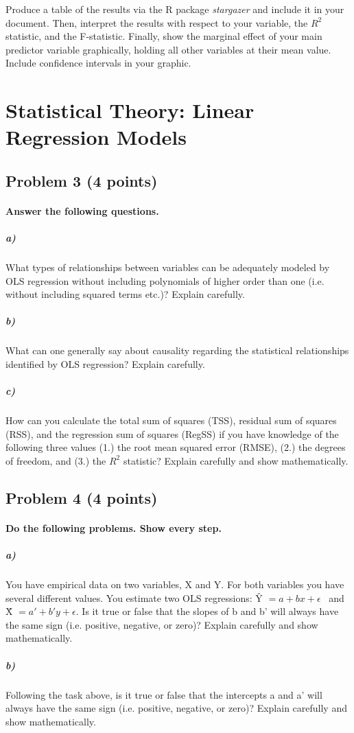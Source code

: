 \documentclass[12pt]{article}
\begin{document}
Produce a table of the results via the R package \textit{stargazer} and include it in your document. Then, interpret the results with respect to your variable, the $R^2$ statistic, and the F-statistic. Finally, show the marginal effect of your main predictor variable graphically, holding all other variables at their mean value. Include confidence intervals in your graphic.



\pagebreak

\section*{Statistical Theory: Linear Regression Models}

\subsection*{Problem 3 (4 points)}

\paragraph{Answer the following questions.}

\subparagraph{a)} What types of relationships between variables can be adequately modeled by OLS regression without including polynomials of higher order than one (i.e. without including squared terms etc.)? Explain carefully.

\subparagraph{b)} What can one generally say about causality regarding the statistical relationships identified by OLS regression? Explain carefully.

\subparagraph{c)} How can you calculate the total sum of squares (TSS), residual sum of squares (RSS), and the regression sum of squares (RegSS) if you have knowledge of the following three values (1.) the root mean squared error (RMSE), (2.) the degrees of freedom, and (3.) the $R^2$ statistic? Explain carefully and show mathematically.



\subsection*{Problem 4 (4 points)}

\paragraph{Do the following problems. Show every step.}

\subparagraph{a)} You have empirical data on two variables, X and Y. For both variables you have several different values. You estimate two OLS regressions: \^{Y} $= a + bx + \epsilon$ \ and \^{X} $= a' + b'y + \epsilon$. Is it true or false that the slopes of b and b' will always have the same sign (i.e. positive, negative, or zero)? Explain carefully and show mathematically.

\subparagraph{b)} Following the task above, is it true or false that the intercepts a and a' will always have the same sign (i.e. positive, negative, or zero)? Explain carefully and show mathematically.
\end{document}
